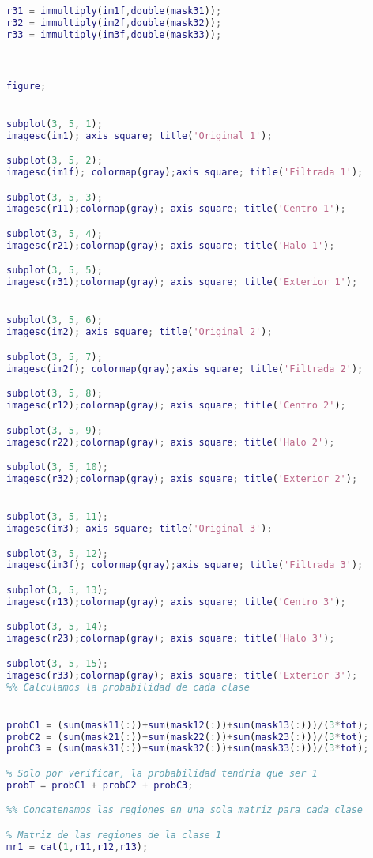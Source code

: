 \documentclass[10pt,journal,compsoc]{IEEEtran}
\begin{document}
\begin{lstlisting}[language=Matlab,basicstyle=\small]
% Obtenemos las regiones de la clase 3
r31 = immultiply(im1f,double(mask31));
r32 = immultiply(im2f,double(mask32));
r33 = immultiply(im3f,double(mask33));



figure;


subplot(3, 5, 1);
imagesc(im1); axis square; title('Original 1');

subplot(3, 5, 2);
imagesc(im1f); colormap(gray);axis square; title('Filtrada 1');

subplot(3, 5, 3);
imagesc(r11);colormap(gray); axis square; title('Centro 1');

subplot(3, 5, 4);
imagesc(r21);colormap(gray); axis square; title('Halo 1');

subplot(3, 5, 5);
imagesc(r31);colormap(gray); axis square; title('Exterior 1');


subplot(3, 5, 6);
imagesc(im2); axis square; title('Original 2');

subplot(3, 5, 7);
imagesc(im2f); colormap(gray);axis square; title('Filtrada 2');

subplot(3, 5, 8);
imagesc(r12);colormap(gray); axis square; title('Centro 2');

subplot(3, 5, 9);
imagesc(r22);colormap(gray); axis square; title('Halo 2');

subplot(3, 5, 10);
imagesc(r32);colormap(gray); axis square; title('Exterior 2');


subplot(3, 5, 11);
imagesc(im3); axis square; title('Original 3');

subplot(3, 5, 12);
imagesc(im3f); colormap(gray);axis square; title('Filtrada 3');

subplot(3, 5, 13);
imagesc(r13);colormap(gray); axis square; title('Centro 3');

subplot(3, 5, 14);
imagesc(r23);colormap(gray); axis square; title('Halo 3');

subplot(3, 5, 15);
imagesc(r33);colormap(gray); axis square; title('Exterior 3');
%% Calculamos la probabilidad de cada clase


probC1 = (sum(mask11(:))+sum(mask12(:))+sum(mask13(:)))/(3*tot);
probC2 = (sum(mask21(:))+sum(mask22(:))+sum(mask23(:)))/(3*tot);
probC3 = (sum(mask31(:))+sum(mask32(:))+sum(mask33(:)))/(3*tot);

% Solo por verificar, la probabilidad tendria que ser 1
probT = probC1 + probC2 + probC3;

%% Concatenamos las regiones en una sola matriz para cada clase

% Matriz de las regiones de la clase 1
mr1 = cat(1,r11,r12,r13);


\end{lstlisting}
\end{document}
